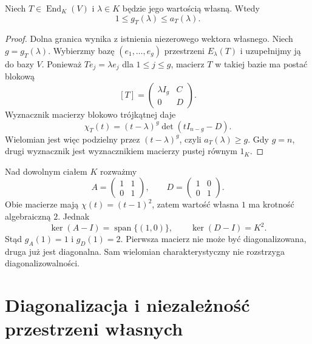 \begin{stwierdzenie}
\label{prop:lin14-krotnosci}
Niech \(T\in\operatorname{End}_K(V)\)
i \(\lambda\in K\) będzie jego wartością własną.
Wtedy
\[
 1\le g_T(\lambda)\le a_T(\lambda).
\]
\end{stwierdzenie}
\begin{proof}
Dolna granica wynika z istnienia
niezerowego wektora własnego.
Niech \(g=g_T(\lambda)\).
Wybierzmy bazę
\((e_1,\ldots,e_g)\) przestrzeni \(E_\lambda(T)\)
i uzupełnijmy ją do bazy \(V\).
Ponieważ \(Te_j=\lambda e_j\)
dla \(1\le j\le g\), macierz \(T\)
w takiej bazie ma postać blokową
\[
 [T]=\begin{pmatrix}
 \lambda I_g&C\\0&D
 \end{pmatrix}.
\]
Wyznacznik macierzy blokowo trójkątnej daje
\[
 \chi_T(t)=(t-\lambda)^g\det(tI_{n-g}-D).
\]
Wielomian jest więc podzielny
przez \((t-\lambda)^g\),
czyli \(a_T(\lambda)\ge g\).
Gdy \(g=n\), drugi wyznacznik
jest wyznacznikiem macierzy pustej
równym \(1_K\).
\end{proof}

\begin{przyklad}
\label{prz:lin14-jordan2}
Nad dowolnym ciałem \(K\) rozważmy
\[
 A=\begin{pmatrix}1&1\\0&1\end{pmatrix},
 \qquad
 D=\begin{pmatrix}1&0\\0&1\end{pmatrix}.
\]
Obie macierze mają
\(\chi(t)=(t-1)^2\), zatem
wartość własna \(1\) ma krotność
algebraiczną \(2\).
Jednak
\[
 \ker(A-I)=\operatorname{span}\{(1,0)\},
 \qquad
 \ker(D-I)=K^2.
\]
Stąd \(g_A(1)=1\) i \(g_D(1)=2\).
Pierwsza macierz nie może być
diagonalizowana, druga już jest diagonalna.
Sam wielomian charakterystyczny nie
rozstrzyga diagonalizowalności.
\end{przyklad}

\section{Diagonalizacja i niezależność przestrzeni własnych}
\label{sec:lin14-diagonalizacja}

